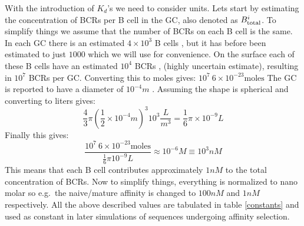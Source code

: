 With the introduction of $K_d$'s we need to consider units.
Lets start by estimating the concentration of BCRs per B cell in the GC, also denoted as $B^i_{\text{total}}$.
To simplify things we assume that the number of BCRs on each B cell is the same.
In each GC there is an estimated $4 \times 10^3$ B cells \cite{kroese1990germinal}, but it has before been estimated to just $1000$ \cite{Childs_Baskerville_Cobey_2015} which we will use for convenience.
On the surface each of these B cells have an estimated $10^4$ BCRs \cite{rieckmann2017social}, \cite{immprot} (highly uncertain estimate), resulting in $10^7$ BCRs per GC.
Converting this to moles gives: $10^7\ 6 \times 10^{-23} \text{moles}$
The GC is reported to have a diameter of $10^{-4} m$ \cite{Romppanen_1981}.
Assuming the shape is spherical and converting to liters gives:
$$
\frac{4}{3} \pi \left(\frac{1}{2} \times 10^{-4} m \right)^3 10^3 \frac{L}{m^3} = \frac{1}{6} \pi \times 10^{-9} L
$$
Finally this gives:
$$\frac{10^7\ 6 \times 10^{-23} \text{moles}}{\frac{1}{6} \pi 10^{-9} L} \approx 10^{-6} M \equiv 10^{3} nM
$$
This means that each B cell contributes approximately $1nM$ to the total concentration of BCRs.
Now to simplify things, everything is normalized to nano molar so e.g.\ the naive/mature affinity is changed to $100nM$ and $1nM$ respectively.
All the above described values are tabulated in table \ref{constants} and used as constant in later simulations of sequences undergoing affinity selection.



